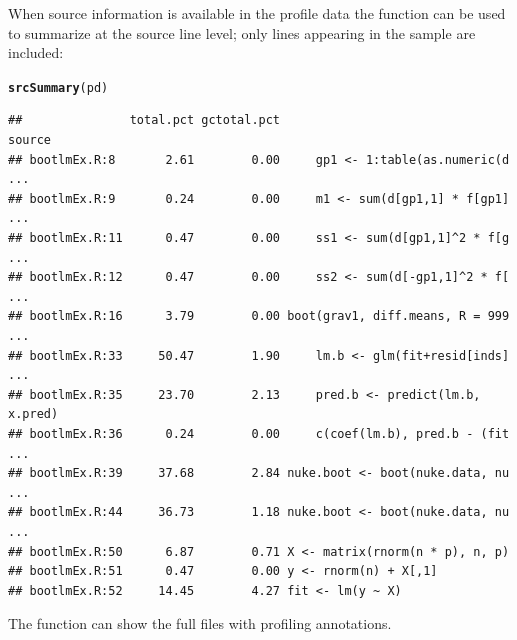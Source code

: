 \documentclass[nojss]{jss}\usepackage[]{graphicx}\usepackage[]{color}
\makeatletter
\newcommand{\hlstd}[1]{\textcolor[rgb]{0.345,0.345,0.345}{#1}}%
\newcommand{\hlkwd}[1]{\textcolor[rgb]{0.737,0.353,0.396}{\textbf{#1}}}%
\newenvironment{kframe}{%
 \def\at@end@of@kframe{}%
 \ifinner\ifhmode%
  \def\at@end@of@kframe{\end{minipage}}%
  \begin{minipage}{\columnwidth}%
 \fi\fi%
 \def\FrameCommand##1{\hskip\@totalleftmargin \hskip-\fboxsep
 \colorbox{shadecolor}{##1}\hskip-\fboxsep
     \hskip-\linewidth \hskip-\@totalleftmargin \hskip\columnwidth}%
 \MakeFramed {\advance\hsize-\width
   \@totalleftmargin\z@ \linewidth\hsize
   \@setminipage}}%
 {\par\unskip\endMakeFramed%
 \at@end@of@kframe}
\newenvironment{knitrout}{}{} %
\makeatother
\begin{document}
When source information is available in the profile data the
 function can be used to summarize at the source line
level; only lines appearing in the sample are included:
\begin{knitrout}\small
{}\color{fgcolor}\begin{kframe}
\begin{alltt}
\hlkwd{srcSummary}\hlstd{(pd)}
\end{alltt}
\begin{verbatim}
##               total.pct gctotal.pct                              source
## bootlmEx.R:8       2.61        0.00     gp1 <- 1:table(as.numeric(d ...
## bootlmEx.R:9       0.24        0.00     m1 <- sum(d[gp1,1] * f[gp1] ...
## bootlmEx.R:11      0.47        0.00     ss1 <- sum(d[gp1,1]^2 * f[g ...
## bootlmEx.R:12      0.47        0.00     ss2 <- sum(d[-gp1,1]^2 * f[ ...
## bootlmEx.R:16      3.79        0.00 boot(grav1, diff.means, R = 999 ...
## bootlmEx.R:33     50.47        1.90     lm.b <- glm(fit+resid[inds] ...
## bootlmEx.R:35     23.70        2.13     pred.b <- predict(lm.b, x.pred)
## bootlmEx.R:36      0.24        0.00     c(coef(lm.b), pred.b - (fit ...
## bootlmEx.R:39     37.68        2.84 nuke.boot <- boot(nuke.data, nu ...
## bootlmEx.R:44     36.73        1.18 nuke.boot <- boot(nuke.data, nu ...
## bootlmEx.R:50      6.87        0.71 X <- matrix(rnorm(n * p), n, p)    
## bootlmEx.R:51      0.47        0.00 y <- rnorm(n) + X[,1]              
## bootlmEx.R:52     14.45        4.27 fit <- lm(y ~ X)
\end{verbatim}
\end{kframe}
\end{knitrout}
The function  can show the full files with
profiling annotations.
\end{document}
